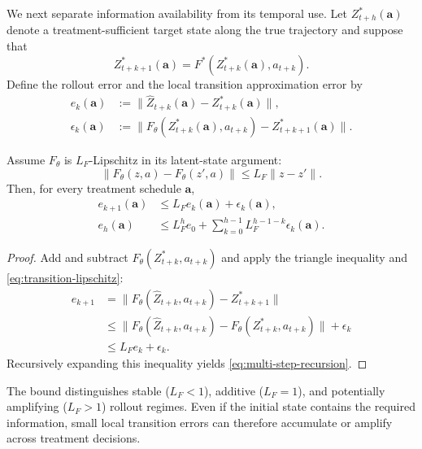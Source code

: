 We next separate information availability from its temporal use. Let
$Z^*_{t+h}(\bm a)$ denote a treatment-sufficient target state along the
true trajectory and suppose that
\begin{equation}
    Z^*_{t+k+1}(\bm a)
    =F^*(Z^*_{t+k}(\bm a),a_{t+k}).
    \label{eq:true-latent-transition}
\end{equation}
Define the rollout error and the local transition approximation error by
\begin{align}
    e_k(\bm a)
    &:=\|\widehat Z_{t+k}(\bm a)-Z^*_{t+k}(\bm a)\|,
    \label{eq:rollout-latent-error}\\
    \epsilon_k(\bm a)
    &:=\|F_\theta(Z^*_{t+k}(\bm a),a_{t+k})
             -Z^*_{t+k+1}(\bm a)\|.
    \label{eq:local-transition-error}
\end{align}

\begin{theorem}
\label{thm:propagation}
Assume $F_\theta$ is $L_F$-Lipschitz in its latent-state argument:
\begin{equation}
    \|F_\theta(z,a)-F_\theta(z',a)\|
    \leq L_F\|z-z'\|.
    \label{eq:transition-lipschitz}
\end{equation}
Then, for every treatment schedule $\bm a$,
\begin{align}
    e_{k+1}(\bm a)
    &\leq L_F e_k(\bm a)+\epsilon_k(\bm a),
    \label{eq:one-step-recursion}\\
    e_h(\bm a)
    &\leq L_F^h e_0
      +\sum_{k=0}^{h-1}L_F^{h-1-k}\epsilon_k(\bm a).
    \label{eq:multi-step-recursion}
\end{align}
\end{theorem}

\begin{proof}
Add and subtract $F_\theta(Z^*_{t+k},a_{t+k})$ and apply the triangle
inequality and \eqref{eq:transition-lipschitz}:
\begin{align}
e_{k+1}
&=\|F_\theta(\widehat Z_{t+k},a_{t+k})-Z^*_{t+k+1}\|\\
&\leq
\|F_\theta(\widehat Z_{t+k},a_{t+k})
  -F_\theta(Z^*_{t+k},a_{t+k})\|
+\epsilon_k\\
&\leq L_F e_k+\epsilon_k.
\end{align}
Recursively expanding this inequality yields
\eqref{eq:multi-step-recursion}.
\end{proof}

The bound distinguishes stable ($L_F<1$), additive ($L_F=1$), and
potentially amplifying ($L_F>1$) rollout regimes. Even if the initial
state contains the required information, small local transition errors
can therefore accumulate or amplify across treatment decisions.

